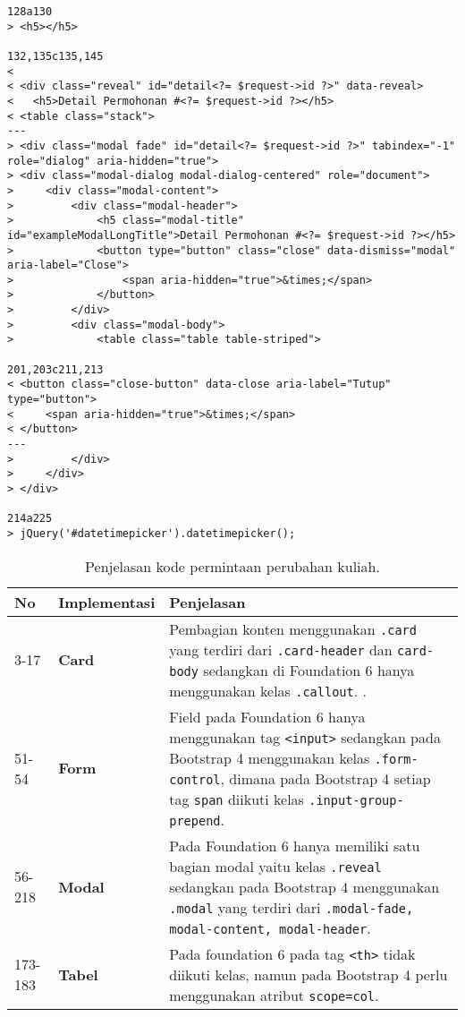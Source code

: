 \begin{lstlisting}
128a130
> <h5></h5>

132,135c135,145
< 
< <div class="reveal" id="detail<?= $request->id ?>" data-reveal>
< 	<h5>Detail Permohonan #<?= $request->id ?></h5>
< <table class="stack">
---
> <div class="modal fade" id="detail<?= $request->id ?>" tabindex="-1" role="dialog" aria-hidden="true">
> <div class="modal-dialog modal-dialog-centered" role="document">
>     <div class="modal-content">
>         <div class="modal-header">
>             <h5 class="modal-title" id="exampleModalLongTitle">Detail Permohonan #<?= $request->id ?></h5>
>             <button type="button" class="close" data-dismiss="modal" aria-label="Close">
>                 <span aria-hidden="true">&times;</span>
>             </button>
>         </div>
>         <div class="modal-body">
>             <table class="table table-striped">

201,203c211,213
< <button class="close-button" data-close aria-label="Tutup" type="button">
<     <span aria-hidden="true">&times;</span>
< </button>
---
>         </div>
>     </div>
> </div>

214a225
> jQuery('#datetimepicker').datetimepicker();
\end{lstlisting}

\begin{table}[H]
	\centering
	\begin{tabularx}{\textwidth}{llX}
		\toprule
		No & Implementasi     & Penjelasan \\
		\midrule
		3-17 & \textbf{Card} & Pembagian konten menggunakan \texttt{.card} yang terdiri dari \texttt{.card-header} dan \texttt{card-body} sedangkan di Foundation 6 hanya menggunakan kelas \texttt{.callout}. .\\
		51-54 & \textbf{Form}  & Field pada Foundation 6 hanya menggunakan tag \texttt{<input>} sedangkan pada Bootstrap 4 menggunakan kelas \texttt{.form-control}, dimana pada Bootstrap 4 setiap tag \texttt{span} diikuti kelas \texttt{.input-group-prepend}.\\
		56-218 & \textbf{Modal}  & Pada Foundation 6 hanya memiliki satu bagian modal yaitu kelas \texttt{.reveal} sedangkan pada Bootstrap 4 menggunakan \texttt{.modal} yang terdiri dari \texttt{.modal-fade, modal-content, modal-header}.\\
		173-183 &\textbf{Tabel} & Pada foundation 6 pada tag \texttt{<th>} tidak diikuti kelas, namun pada Bootstrap 4 perlu menggunakan atribut \texttt{scope=col}.\\
		\bottomrule
	\end{tabularx}%
	\caption{Penjelasan kode permintaan perubahan kuliah.}
	\label{tabel:permintaanPerubahanKuliah}
\end{table}


